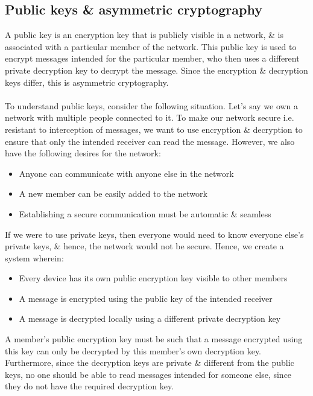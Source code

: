 \subsection{Public keys \& asymmetric cryptography}
A public key is an encryption key that is publicly visible in a network, \& is associated with a particular member of the network. This public key is used to encrypt messages intended for the particular member, who then uses a different private decryption key to decrypt the message. Since the encryption \& decryption keys differ, this is asymmetric cryptography.
\\~\\
To understand public keys, consider the following situation. Let's say we own a network with multiple people connected to it. To make our network secure i.e. resistant to interception of messages, we want to use encryption \& decryption to ensure that only the intended receiver can read the message. However, we also have the following desires for the network:

\begin{itemize}
	\item Anyone can communicate with anyone else in the network
	\item A new member can be easily added to the network
	\item Establishing a secure communication must be automatic \& seamless
\end{itemize}

If we were to use private keys, then everyone would need to know everyone else's private keys, \& hence, the network would not be secure. Hence, we create a system wherein:

\begin{itemize}
	\item Every device has its own public encryption key visible to other members
	\item A message is encrypted using the public key of the intended receiver
	\item A message is decrypted locally using a different private decryption key
\end{itemize}

A member's public encryption key must be such that a message encrypted using this key can only be decrypted by this member's own decryption key. Furthermore, since the decryption keys are private \& different from the public keys, no one should be able to read messages intended for someone else, since they do not have the required decryption key.

